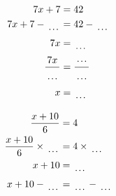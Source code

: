\documentclass[12pt]{article}
\newcounter{minipagecount}
\begin{document}
\begin{multicols}{2}
\begin{minipage}[t]{0.45\textwidth}
    \raggedright %
    \begin{align*} %
        7x + 7 &= 42\\
        7x + 7 - \dotuline{\hspace{5mm}} &= 42 - \dotuline{\hspace{5mm}}\\
        7x &= \dotuline{\hspace{5mm}}\\
        \frac{7x}{\dotuline{\hspace{5mm}}} &= \frac{\dotuline{\hspace{5mm}}}{\dotuline{\hspace{5mm}}}\\
        x &= \dotuline{\hspace{5mm}}\\
    \end{align*}
\end{minipage} %
\noindent{(\theminipagecount)}\hspace{0.1mm} %
\begin{minipage}[t]{0.45\textwidth} %
    \vspace{-26pt}  %
    \raggedright %
    \begin{align*} %
        \frac{x + 10}{6} &= 4\\
        \frac{x + 10}{6} \times\dotuline{\hspace{5mm}} &= 4 \times\dotuline{\hspace{5mm}}\\
        x + 10 &= \dotuline{\hspace{5mm}}\\
        x + 10 - \dotuline{\hspace{5mm}} &= \dotuline{\hspace{5mm}} - \dotuline{\hspace{5mm}}\\

\end{align*}
\end{minipage}
\end{multicols}
\end{document}
